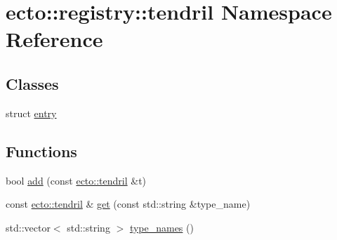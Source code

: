 \hypertarget{namespaceecto_1_1registry_1_1tendril}{\section{ecto\-:\-:registry\-:\-:tendril Namespace Reference}
\label{namespaceecto_1_1registry_1_1tendril}
}
\subsection*{Classes}
\begin{DoxyCompactItemize}
\item 
struct \hyperlink{structecto_1_1registry_1_1tendril_1_1entry}{entry}
\end{DoxyCompactItemize}
\subsection*{Functions}
\begin{DoxyCompactItemize}
\item 
bool \hyperlink{namespaceecto_1_1registry_1_1tendril_ae22480a936472049982cbab1f0ebb042}{add} (const \hyperlink{classecto_1_1tendril}{ecto\-::tendril} \&t)
\item 
const \hyperlink{classecto_1_1tendril}{ecto\-::tendril} \& \hyperlink{namespaceecto_1_1registry_1_1tendril_a0f79f6d8838565c91f43e05c93a3f01d}{get} (const std\-::string \&type\-\_\-name)
\item 
std\-::vector$<$ std\-::string $>$ \hyperlink{namespaceecto_1_1registry_1_1tendril_a7e62217ece919ba72bb0aca35c93fd7b}{type\-\_\-names} ()
\end{DoxyCompactItemize}


